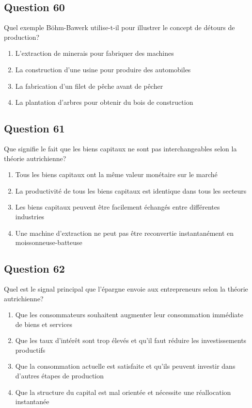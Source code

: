 \documentclass[12pt,a4paper]{article}
\begin{document}
\bigskip


\subsection*{Question 60}
Quel exemple Böhm-Bawerk utilise-t-il pour illustrer le concept de détours de production?

\begin{enumerate}[label=\Alph*., leftmargin=*]
\item L'extraction de minerais pour fabriquer des machines
\item La construction d'une usine pour produire des automobiles
\item La fabrication d'un filet de pêche avant de pêcher
\item La plantation d'arbres pour obtenir du bois de construction
\end{enumerate}

\bigskip


\subsection*{Question 61}
Que signifie le fait que les biens capitaux ne sont pas interchangeables selon la théorie autrichienne?

\begin{enumerate}[label=\Alph*., leftmargin=*]
\item Tous les biens capitaux ont la même valeur monétaire sur le marché
\item La productivité de tous les biens capitaux est identique dans tous les secteurs
\item Les biens capitaux peuvent être facilement échangés entre différentes industries
\item Une machine d'extraction ne peut pas être reconvertie instantanément en moissonneuse-batteuse
\end{enumerate}

\bigskip


\subsection*{Question 62}
Quel est le signal principal que l'épargne envoie aux entrepreneurs selon la théorie autrichienne?

\begin{enumerate}[label=\Alph*., leftmargin=*]
\item Que les consommateurs souhaitent augmenter leur consommation immédiate de biens et services
\item Que les taux d'intérêt sont trop élevés et qu'il faut réduire les investissements productifs
\item Que la consommation actuelle est satisfaite et qu'ils peuvent investir dans d'autres étapes de production
\item Que la structure du capital est mal orientée et nécessite une réallocation instantanée
\end{enumerate}
\end{document}
